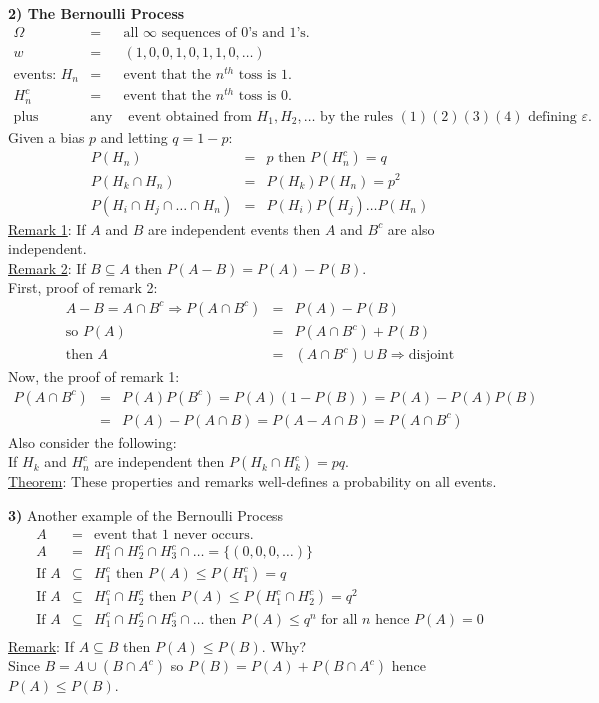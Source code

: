 {\bf 2) The Bernoulli Process}
\begin{eqnarray*}
\Omega &=& \mbox{all } \infty \mbox{ sequences of 0's and 1's.}\\
w &=& (1, 0, 0, 1, 0, 1, 1, 0, \ldots)\\
\mbox{events: } H_n &=& \mbox{event that the } n^{th} \mbox{ toss is
1.}\\
H_n^c &=&\mbox{event that the } n^{th} \mbox{ toss is 0.}\\
\mbox{plus}&\mbox{any}& \mbox{ event obtained from } H_1, H_2, \ldots \mbox{ by the
rules } (1)(2)(3)(4) \mbox{ defining } \varepsilon.
\end{eqnarray*}
Given a bias $p$ and letting $q=1-p$:
\begin{eqnarray*}
P(H_n)&=&p \mbox{  then  } P(H_n^c)=q\\
P(H_k \cap H_n) &=& P(H_k)P(H_n)= p^2\\
P(H_i \cap H_j \cap \ldots \cap H_n)&=& P(H_i)
P(H_j) \ldots P(H_n)
\end{eqnarray*}
\underline{Remark 1}: If $A$ and $B$ are independent events then $A$ and
$B^c$ are also independent.\\
\underline{Remark 2}: If $B \subseteq A$ then $P(A-B) =P(A)-P(B)$.\\
First, proof of remark 2:
\begin{eqnarray*}
A-B=A \cap B^c \Rightarrow P(A \cap B^c) &=& P(A) -P(B)\\
\mbox{so } P(A)&=&P(A \cap B^c) + P(B)\\
\mbox{then } A&=& (A \cap B^c) \cup B \Rightarrow \mbox{disjoint}
\end{eqnarray*}
Now, the proof of remark 1:
\begin{eqnarray*}
P(A\cap B^c)&=& P(A) P(B^c) = P(A)(1-P(B)) = P(A)-P(A)P(B)\\
&=&P(A)-P(A\cap B) = P(A-A\cap B) =P(A\cap B^c)
\end{eqnarray*}
Also consider the following:\\ 
If $H_k$ and $H_n^c$ are independent then $P(H_k \cap H_k^c)=pq$.\\
\underline{Theorem}: These properties and remarks well-defines a probability on
all events.

{\bf 3)} Another example of the Bernoulli Process
\begin{eqnarray*}
A&=& \mbox{event that 1 never occurs.}\\   
A&=& H_1^c \cap H_2^c \cap H_3^c \cap \ldots = \{ (0, 0, 0,\ldots)\}\\
\mbox{If } A&\subseteq& H_1^c \mbox{ then  } P(A) \leq P(H_1^c)=q\\
\mbox{If } A&\subseteq& H_1^c \cap H_2^c \mbox{ then  } P(A) \leq P(H_1^c
\cap H_2^c)=q^2\\ 
\mbox{If } A&\subseteq& H_1^c \cap H_2^c \cap H_3^c \cap \ldots
\mbox{ then } P(A) \leq q^n \mbox{ for all $n$ hence  } P(A) =0\\
\end{eqnarray*}
\underline{Remark}: If $A \subseteq B$ then $P(A)\leq P(B)$. Why?\\
Since $B= A \cup (B\cap A^c)$ so $P(B) = P(A) + P(B \cap A^c)$ hence
$P(A)\leq P(B)$.


